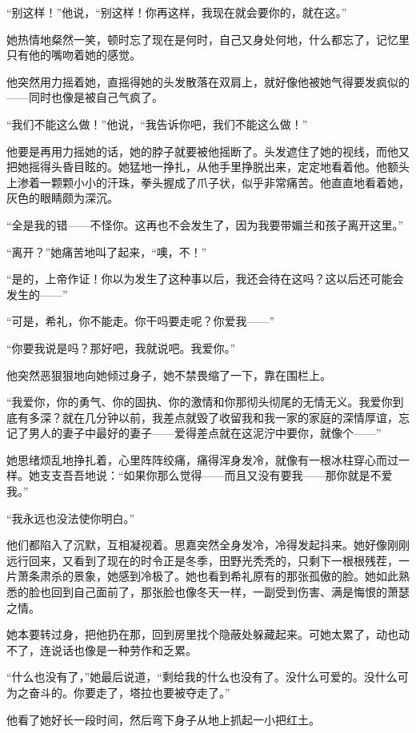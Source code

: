 \par “别这样！”他说，“别这样！你再这样，我现在就会要你的，就在这。”
\par 她热情地粲然一笑，顿时忘了现在是何时，自己又身处何地，什么都忘了，记忆里只有他的嘴吻着她的感觉。
\par 他突然用力摇着她，直摇得她的头发散落在双肩上，就好像他被她气得要发疯似的——同时也像是被自己气疯了。
\par “我们不能这么做！”他说，“我告诉你吧，我们不能这么做！”
\par 他要是再用力摇她的话，她的脖子就要被他摇断了。头发遮住了她的视线，而他又把她摇得头昏目眩的。她猛地一挣扎，从他手里挣脱出来，定定地看着他。他额头上渗着一颗颗小小的汗珠，拳头握成了爪子状，似乎非常痛苦。他直直地看着她，灰色的眼睛颇为深沉。
\par “全是我的错——不怪你。这再也不会发生了，因为我要带媚兰和孩子离开这里。”
\par “离开？”她痛苦地叫了起来，“噢，不！”
\par “是的，上帝作证！你以为发生了这种事以后，我还会待在这吗？这以后还可能会发生的——”
\par “可是，希礼，你不能走。你干吗要走呢？你爱我——”
\par “你要我说是吗？那好吧，我就说吧。我爱你。”
\par 他突然恶狠狠地向她倾过身子，她不禁畏缩了一下，靠在围栏上。
\par “我爱你，你的勇气、你的固执、你的激情和你那彻头彻尾的无情无义。我爱你到底有多深？就在几分钟以前，我差点就毁了收留我和我一家的家庭的深情厚谊，忘记了男人的妻子中最好的妻子——爱得差点就在这泥泞中要你，就像个——”
\par 她思绪烦乱地挣扎着，心里阵阵绞痛，痛得浑身发冷，就像有一根冰柱穿心而过一样。她支支吾吾地说：“如果你那么觉得——而且又没有要我——那你就是不爱我。”
\par “我永远也没法使你明白。”
\par 他们都陷入了沉默，互相凝视着。思嘉突然全身发冷，冷得发起抖来。她好像刚刚远行回来，又看到了现在的时令正是冬季，田野光秃秃的，只剩下一根根残茬，一片萧条肃杀的景象，她感到冷极了。她也看到希礼原有的那张孤傲的脸。她如此熟悉的脸也回到自己面前了，那张脸也像冬天一样，一副受到伤害、满是悔恨的萧瑟之情。
\par 她本要转过身，把他扔在那，回到房里找个隐蔽处躲藏起来。可她太累了，动也动不了，连说话也像是一种劳作和乏累。
\par “什么也没有了，”她最后说道，“剩给我的什么也没有了。没什么可爱的。没什么可为之奋斗的。你要走了，塔拉也要被夺走了。”
\par 他看了她好长一段时间，然后弯下身子从地上抓起一小把红土。
